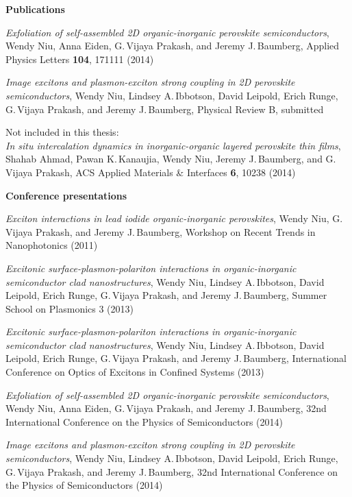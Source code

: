 \thispagestyle{empty}
\noindent \textbf{\Large Publications}

\vspace{8mm}

\noindent \textit{Exfoliation of self-assembled 2D organic-inorganic perovskite semiconductors}, Wendy Niu, Anna Eiden, G.\,Vijaya Prakash, and Jeremy J.\,Baumberg, Applied Physics Letters \textbf{104}, 171111 (2014)

\vspace{4mm}

\noindent \textit{Image excitons and plasmon-exciton strong coupling in 2D perovskite semiconductors}, Wendy Niu, Lindsey A.\,Ibbotson, David Leipold, Erich Runge, G.\,Vijaya Prakash, and Jeremy J.\,Baumberg, Physical Review B, submitted

\vspace{4mm}
\noindent Not included in this thesis:\\
\noindent \textit{In situ intercalation dynamics in inorganic-organic layered perovskite thin films}, Shahab Ahmad, Pawan K.\,Kanaujia, Wendy Niu, Jeremy J.\,Baumberg, and G.\,Vijaya Prakash, ACS Applied Materials \& Interfaces \textbf{6}, 10238 (2014)

\vfill

\noindent \textbf{\Large Conference presentations}

\vspace{8mm}
\noindent \textit{Exciton interactions in lead iodide organic-inorganic perovskites}, Wendy Niu, G.\,Vijaya Prakash, and Jeremy J.\,Baumberg, Workshop on Recent Trends in Nanophotonics (2011)

\vspace{4mm}

\noindent \textit{Excitonic surface-plasmon-polariton interactions in organic-inorganic semiconductor clad nanostructures}, Wendy Niu, Lindsey A.\,Ibbotson, David Leipold, Erich Runge, G.\,Vijaya Prakash, and Jeremy J.\,Baumberg, Summer School on Plasmonics 3 (2013)

\vspace{4mm}

\noindent \textit{Excitonic surface-plasmon-polariton interactions in organic-inorganic semiconductor clad nanostructures}, Wendy Niu, Lindsey A.\,Ibbotson, David Leipold, Erich Runge, G.\,Vijaya Prakash, and Jeremy J.\,Baumberg, International Conference on Optics of Excitons in Confined Systems (2013)

\vspace{4mm}

\noindent \textit{Exfoliation of self-assembled 2D organic-inorganic perovskite semiconductors}, Wendy Niu, Anna Eiden, G.\,Vijaya Prakash, and Jeremy J.\,Baumberg, 32nd International Conference on the Physics of Semiconductors (2014)

\vspace{4mm}

\noindent \textit{Image excitons and plasmon-exciton strong coupling in 2D perovskite semiconductors}, Wendy Niu, Lindsey A.\,Ibbotson, David Leipold, Erich Runge, G.\,Vijaya Prakash, and Jeremy J.\,Baumberg, 32nd International Conference on the Physics of Semiconductors (2014)